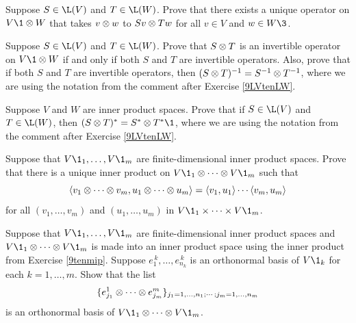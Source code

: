 \begin{exercises}
\exercise
Suppose $S \in \L(V)$ and $T \in \L(W)$. Prove that there exists a unique operator on $V\1 \tensor W$ that takes
$v \otimes w$ to $Sv \otimes Tw$ for all $v \in V$ and $w \in W\3$.
\label{9LVtenLW}


\exercise
Suppose $S \in \L(V)$ and $T \in \L(W)$. Prove that $S \otimes T$ is an invertible operator on $V\1 \tensor W$ if and only if both $S$ and $T$ are invertible operators. Also, prove that  if both $S$ and $T$ are invertible operators, then
$(S \otimes T)^{-1} = S^{-1} \otimes T^{-1}$, where we are using the notation from the comment after Exercise \ref{9LVtenLW}.


\exercise
Suppose $V$ and $W$ are inner product spaces. Prove that if $S \in \L(V)$ and $T \in \L(W)$, then $(S \tensor T)^* = S^* \tensor T^*\1$, where we are using the notation from the comment after Exercise \ref{9LVtenLW}.\label{9STstar}


\exercise
Suppose that $V\1_1, \ldots, V\1_m$ are finite-dimensional inner product spaces. Prove that there is a unique inner product on
$V\1_1 \tensor \cdots \tensor V\1_m$ such that\label{9tenmip}
\[
\langle v_1 \otimes \cdots \otimes v_m, u_1 \otimes \cdots \otimes u_m \rangle =
\langle v_1, u_1\rangle \cdots \langle v_m, u_m\rangle
\]
for all $(v_1, \ldots, v_m)$ and $(u_1, \ldots, u_m)$ in $V\1_1 \times \cdots \times V\1_m$.


\exercise
Suppose that $V\1_1, \ldots, V\1_m$ are finite-dimensional inner product spaces and $V\1_1 \tensor \cdots \tensor V\1_m$ is made into an inner product space using the inner product from Exercise \ref{9tenmip}. Suppose $e_1^{\,k}, \ldots, e_{n_k}^{\,k}$ is an orthonormal basis of $V\1_k$ for each $k = 1, \ldots, m$. Show that the list\label{9tenmip2}
\[
\{e_{j_1}^1 \otimes \cdots \otimes e_{j_m}^m\}_{j_1 = 1, \ldots, n_1; \cdots ; j_m = 1, \ldots, n_m}
\]
is an orthonormal basis of $V\1_1 \tensor \cdots \tensor V\1_m$.


\end{exercises}

\endinput 

